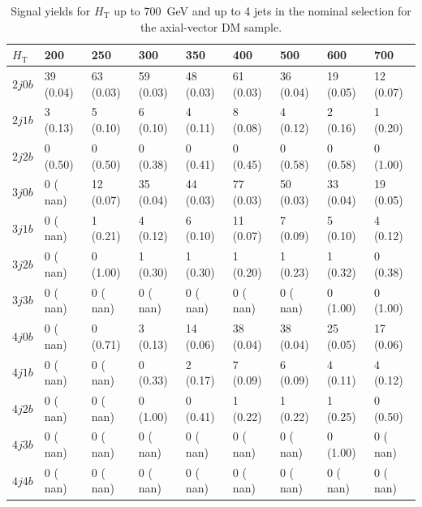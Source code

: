 \begin{table}[h]
\small
\begin{tabular}{lllllllll}
\hline \hline
$H_\textrm{T}$                 &     200 &            250 &             300&             350&             400&             500&             600&             700  \\\hline\hline
$2j 0b$&          39 (0.04)&       63 (0.03)&       59 (0.03)&       48 (0.03)&       61 (0.03)&       36 (0.04)&       19 (0.05)&       12 (0.07) \\\hline
$2j 1b$&           3 (0.13)&        5 (0.10)&        6 (0.10)&        4 (0.11)&        8 (0.08)&        4 (0.12)&        2 (0.16)&        1 (0.20) \\\hline
$2j 2b$&           0 (0.50)&        0 (0.50)&        0 (0.38)&        0 (0.41)&        0 (0.45)&        0 (0.58)&        0 (0.58)&        0 (1.00) \\\hline
$3j 0b$&           0 ( nan)&       12 (0.07)&       35 (0.04)&       44 (0.03)&       77 (0.03)&       50 (0.03)&       33 (0.04)&       19 (0.05) \\\hline
$3j 1b$&           0 ( nan)&        1 (0.21)&        4 (0.12)&        6 (0.10)&       11 (0.07)&        7 (0.09)&        5 (0.10)&        4 (0.12) \\\hline
$3j 2b$&           0 ( nan)&        0 (1.00)&        1 (0.30)&        1 (0.30)&        1 (0.20)&        1 (0.23)&        1 (0.32)&        0 (0.38) \\\hline
$3j 3b$&           0 ( nan)&        0 ( nan)&        0 ( nan)&        0 ( nan)&        0 ( nan)&        0 ( nan)&        0 (1.00)&        0 (1.00) \\\hline
$4j 0b$&           0 ( nan)&        0 (0.71)&        3 (0.13)&       14 (0.06)&       38 (0.04)&       38 (0.04)&       25 (0.05)&       17 (0.06) \\\hline
$4j 1b$&           0 ( nan)&        0 ( nan)&        0 (0.33)&        2 (0.17)&        7 (0.09)&        6 (0.09)&        4 (0.11)&        4 (0.12) \\\hline
$4j 2b$&           0 ( nan)&        0 ( nan)&        0 (1.00)&        0 (0.41)&        1 (0.22)&        1 (0.22)&        1 (0.25)&        0 (0.50) \\\hline
$4j 3b$&           0 ( nan)&        0 ( nan)&        0 ( nan)&        0 ( nan)&        0 ( nan)&        0 ( nan)&        0 (1.00)&        0 ( nan) \\\hline
$4j 4b$&           0 ( nan)&        0 ( nan)&        0 ( nan)&        0 ( nan)&        0 ( nan)&        0 ( nan)&        0 ( nan)&        0 ( nan) \\\hline
\hline
\end{tabular}
\caption{Signal yields for $H_\textrm{T}$ up to 700~GeV and up to 4 jets in the nominal selection for the axial-vector DM sample.}
\label{tab:sig_yields_AVDM_nom}
\end{table}

